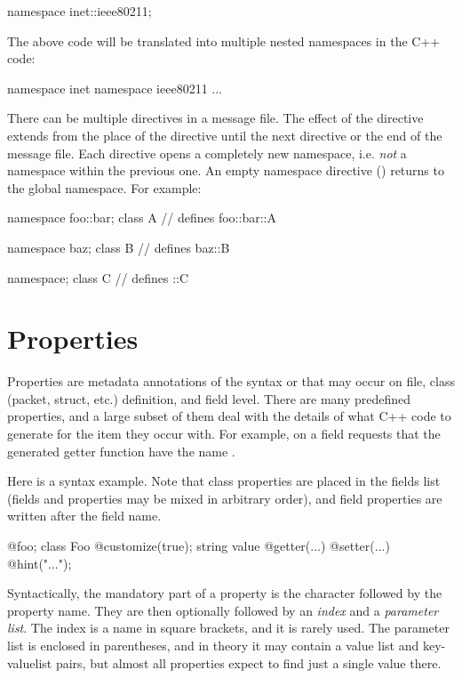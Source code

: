 \begin{msg}
namespace inet::ieee80211;
\end{msg}

The above code will be translated into multiple nested namespaces in the C++ code:

\begin{cpp}
namespace inet { namespace ieee80211 {
...
}}
\end{cpp}

There can be multiple  directives in a message file. The
effect of the  directive extends from the place of the
directive until the next  directive or the end of the
message file. Each  directive opens a completely new
namespace, i.e. \textit{not} a namespace within the previous one. An empty
namespace directive () returns to the global namespace. For
example:

\begin{msg}
namespace foo::bar;
class A {}  // defines foo::bar::A

namespace baz;
class B {}  // defines baz::B

namespace;
class C {}  // defines ::C
\end{msg}


\section{Properties}
\label{sec:msg-defs:properties}

Properties are metadata annotations of the syntax  or
 that may occur on file, class (packet, struct, etc.)
definition, and field level. There are many predefined properties, and a
large subset of them deal with the details of what C++ code to generate for the
item they occur with. For example,  on a field requests
that the generated getter function have the name .

Here is a syntax example. Note that class properties are placed in the fields
list (fields and properties may be mixed in arbitrary order), and field
properties are written after the field name.

\begin{msg}
@foo;
class Foo {
  @customize(true);
  string value @getter(...) @setter(...) @hint("...");
}
\end{msg}

Syntactically, the mandatory part of a property is the  character
followed by the property name. They are then optionally followed by an
\textit{index} and a \textit{parameter list}. The index is a name in square
brackets, and it is rarely used. The parameter list is enclosed in parentheses,
and in theory it may contain a value list and key-valuelist pairs, but
almost all properties expect to find just a single value there.

